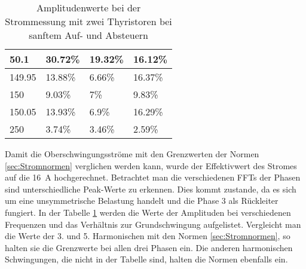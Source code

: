 \begin{table}[ht]
\begin{tabular}{|l|l|l|l|}
		50.1              & 30.72\%                                                                             & 19.32\%                                                                             & 16.12\%                                                                             \\ \hline
		149.95            & 13.88\%                                                                             & 6.66\%                                                                              & 16.37\%                                                                             \\ \hline
		150               & 9.03\%                                                                              & 7\%                                                                                 & 9.83\%                                                                              \\ \hline
		150.05            & 13.93\%                                                                             & 6.9\%                                                                               & 16.29\%                                                                             \\ \hline
		250		          & 3.74\%                                                                             & 3.46\%                                                                               & 2.59\%                                                                             \\ \hline
	\end{tabular}
	\caption{Amplitudenwerte bei der Strommessung mit zwei Thyristoren bei sanftem Auf- und Absteuern}\label{tab:Mess_2Thyristoren_Spannung_Widerstand_AufAb_sanft_stroeme}
\end{table}

Damit die Oberschwingungsströme mit den  Grenzwerten der Normen \ref{sec:Stromnormen} verglichen werden kann, wurde der Effektivwert des Stromes auf die \SI{16}{A} hochgerechnet. Betrachtet man die verschiedenen FFTs der Phasen sind unterschiedliche Peak-Werte zu erkennen. Dies kommt zustande, da es sich um eine unsymmetrische Belastung handelt und die Phase 3 als Rückleiter fungiert. In der Tabelle \ref{tab:Mess_2Thyristoren_Spannung_Widerstand_AufAb_sanft_stroeme} werden die Werte der Amplituden bei verschiedenen Frequenzen und das Verhältnis zur Grundschwingung aufgelistet. Vergleicht man die Werte der 3. und 5. Harmonischen mit den Normen \ref{sec:Stromnormen}, so halten sie die Grenzwerte bei allen drei Phasen ein. Die anderen harmonischen Schwingungen, die nicht in der Tabelle sind, halten die Normen ebenfalls ein.

